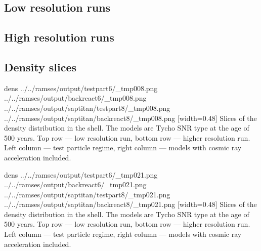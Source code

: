 \documentclass[referee,oldversion]{aa}
\def\basedir{../../ramses/output}
\begin{document}
 \subsection{Low resolution runs}
 
\def\xilo{\basedir/backreact6}
\def\xime{\basedir/weakaccel6}
\def\xihi{\basedir/testpart6}
 


 \subsection{High resolution runs}

% 

\def\xilo{\basedir/saptitan/backreact8}
\def\xime{\basedir/saptitan/weakaccel8}
\def\xihi{\basedir/saptitan/testpart8}
 

\subsection{Density slices}

\FIGfo dens {\basedir/testpart6/_tmp008.png} {\basedir/backreact6/_tmp008.png}  {\basedir/saptitan/testpart8/_tmp008.png} {\basedir/saptitan/backreact8/_tmp008.png} [width=0.48\hsize] Slices of the density distribution in the shell. The models are Tycho SNR type at the age of 500 years. Top row --- low resolution run, bottom row --- higher resolution run. Left column --- test particle regime, right column --- models with cosmic ray acceleration included.

\FIGfo dens \basedir/testpart6/_tmp021.png \basedir/backreact6/_tmp021.png  \basedir/saptitan/testpart8/_tmp021.png \basedir/saptitan/backreact8/_tmp021.png [width=0.48\hsize] Slices of the density distribution in the shell. The models are Tycho SNR type at the age of 500 years. Top row --- low resolution run, bottom row --- higher resolution run. Left column --- test particle regime, right column --- models with cosmic ray acceleration included.
 


%




%
\end{document}
